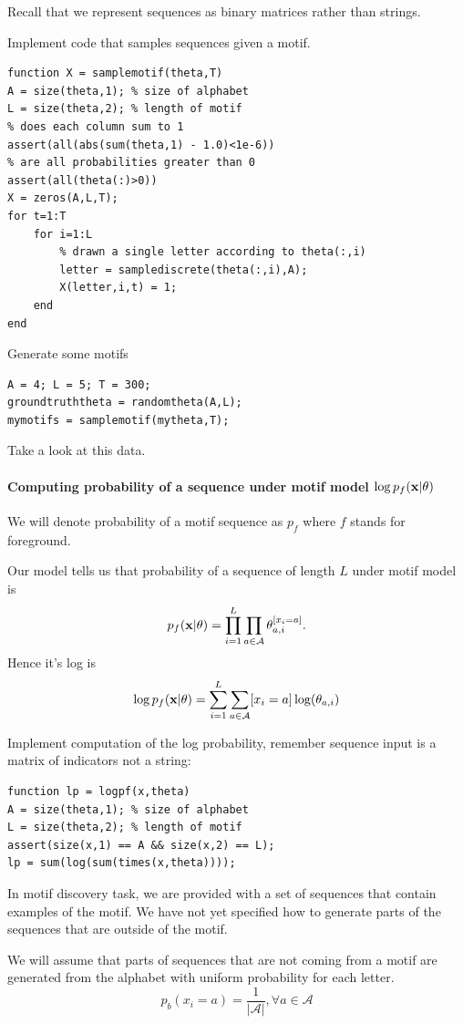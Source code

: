 \documentclass{article}
\begin{document}
{Recall that we represent sequences as binary matrices rather than strings.

Implement code that samples sequences given a motif.
\begin{verbatim}
function X = samplemotif(theta,T)
A = size(theta,1); % size of alphabet
L = size(theta,2); % length of motif
% does each column sum to 1
assert(all(abs(sum(theta,1) - 1.0)<1e-6))
% are all probabilities greater than 0
assert(all(theta(:)>0))
X = zeros(A,L,T);
for t=1:T
    for i=1:L
        % drawn a single letter according to theta(:,i)
        letter = samplediscrete(theta(:,i),A);
        X(letter,i,t) = 1;
    end
end
\end{verbatim}

Generate some motifs

\begin{verbatim}
A = 4; L = 5; T = 300;
groundtruththeta = randomtheta(A,L);
mymotifs = samplemotif(mytheta,T);
\end{verbatim}

Take a look at this data.


\paragraph{Computing probability of a sequence under motif model $\log p_f(\mathbf{x}|\theta)$} 
We will denote probability of a motif sequence as $p_f$ where $f$ stands for foreground.

Our model tells us that probability of a sequence of length $L$ under motif model is 
\[
p_f(\mathbf{x}|\theta) = \prod_{i=1}^L\prod_{a \in \mathcal{A}} \theta_{a,i}^{[x_i = a]}.
\]
Hence it's log is
\[
\log p_f(\mathbf{x}|\theta) = \sum_{i=1}^L\sum_{a \in \mathcal{A}} [x_i = a]\log(\theta_{a,i})
\]

Implement computation of the log probability, remember sequence input is a matrix of indicators not a string:
\begin{verbatim}
function lp = logpf(x,theta)
A = size(theta,1); % size of alphabet
L = size(theta,2); % length of motif
assert(size(x,1) == A && size(x,2) == L);
lp = sum(log(sum(times(x,theta))));
\end{verbatim}

\newproblem{2pt} In motif discovery task, we are provided with a set of sequences that contain
examples of the motif. We have not yet specified how to generate parts of the sequences that are 
outside of the motif. 

We will assume that parts of sequences that are not coming from a motif are generated from the alphabet
with uniform probability for each letter.
\[
p_b(x_i = a) = \frac{1}{|\mathcal{A}|}, \forall a \in \mathcal{A}
\]

}
\end{document}
